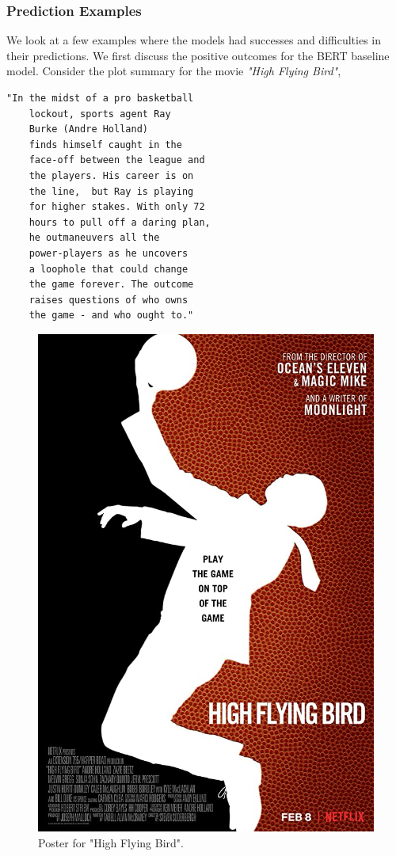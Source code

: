 \documentclass[10pt]{article}
\begin{document}
\subsubsection{Prediction Examples}
We look at a few examples where the models had successes and difficulties in their predictions. We first discuss the positive outcomes for the BERT baseline model. Consider the plot summary for the movie \textit{"High Flying Bird"},

\begin{Verbatim}[fontsize=\small]
    "In the midst of a pro basketball 
    lockout, sports agent Ray 
    Burke (Andre Holland) 
    finds himself caught in the 
    face-off between the league and
    the players. His career is on
    the line,  but Ray is playing 
    for higher stakes. With only 72
    hours to pull off a daring plan, 
    he outmaneuvers all the 
    power-players as he uncovers 
    a loophole that could change 
    the game forever. The outcome 
    raises questions of who owns 
    the game - and who ought to."
\end{Verbatim}

\begin{figure}[!h]
    \centering
    \includegraphics[scale=0.1]{images/HighFlyingBird.jpg}
    \caption{Poster for "High Flying Bird".}
    \label{fig:HighFlyingBird}
\end{figure}
\end{document}
